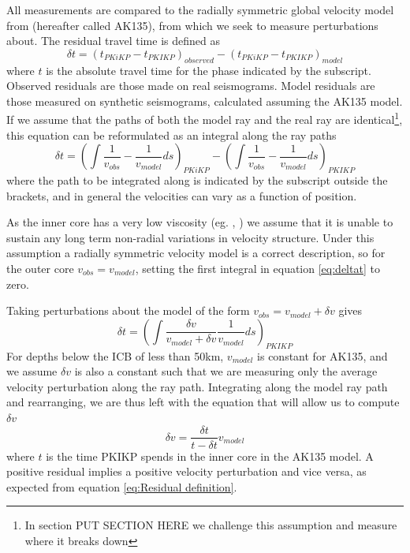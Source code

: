 \documentclass[11pt,a4paper]{article}
\begin{document}
All measurements are compared to the radially symmetric global velocity model from \cite{Kennett1995b} (hereafter called AK135), from which we seek to measure perturbations about. The residual travel time is defined as
\begin{equation}
	\delta t = \left ( t_{PKiKP} - t_{PKIKP} \right )_{observed} -  \left ( t_{PKiKP} - t_{PKIKP} \right )_{model}
	\label{eq:Residual definition}
\end{equation}
where $t$ is the absolute travel time for the phase indicated by the subscript. Observed residuals are those made on real seismograms. Model residuals are those measured on synthetic seismograms, calculated assuming the AK135 model. If we assume that the paths of both the model ray and the real ray are identical\footnote{In section PUT SECTION HERE we challenge this assumption and measure where it breaks down}, this equation can be reformulated as an integral along the ray paths
\begin{equation}
		\delta t = \left (  \int \frac{1}{v_{obs}} - \frac{1}{v_{model}} ds  \right )_{PKiKP} - \left (  \int \frac{1}{v_{obs}} - \frac{1}{v_{model}} ds \right )_{PKIKP}
		\label{eq:deltat}
\end{equation}
where the path to be integrated along is indicated by the subscript outside the brackets, and in general the velocities can vary as a function of position.

As the inner core has a very low viscosity (eg. \cite{Wijs1998}, \cite{Zhang2000}) we assume that it is unable to sustain any long term non-radial variations in velocity structure. Under this assumption a radially symmetric velocity model is a correct description, so for the outer core $v_{obs} = v_{model}$, setting the first integral in equation \eqref{eq:deltat} to zero.

Taking perturbations about the model of the form $v_{obs} = v_{model} + \delta v$ gives
\begin{equation}
	\delta t =\left ( \int \frac{\delta v}{v_{model} + \delta v }\frac{1}{v_{model}} ds \right )_{PKIKP}
\end{equation}
For depths below the ICB of less than 50km, $v_{model}$ is constant for AK135, and we assume $\delta v$ is also a constant such that we are measuring only the average velocity perturbation along the ray path. Integrating along the model ray path and rearranging, we are thus left with the equation that will allow us to compute $\delta v$
\begin{equation}
	\delta v = \frac{\delta t}{t - \delta t} v_{model}
	\label{eq:Delta v}
\end{equation}
where $t$ is the time PKIKP spends in the inner core in the AK135 model. A positive residual implies a positive velocity perturbation and vice versa, as expected from equation \eqref{eq:Residual definition}.
\end{document}
